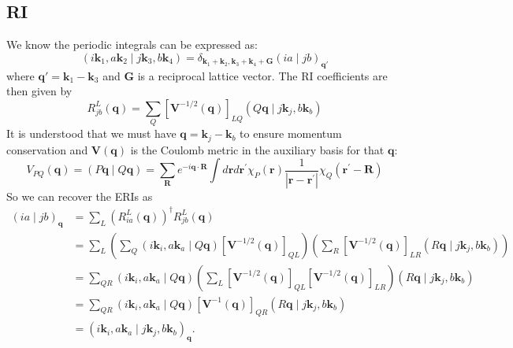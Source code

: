 \subsection{RI}
We know the periodic integrals can be expressed as:
\begin{equation}
    \left(i \mathbf{k}_1, a \mathbf{k}_2 \mid j \mathbf{k}_3, b \mathbf{k}_4\right)=\delta_{\mathbf{k}_1+\mathbf{k}_2, \mathbf{k}_3+\mathbf{k}_4+\mathbf{G}}(i a \mid j b)_{\mathbf{q}'}
\end{equation}
where $\mathbf{q}'=\mathbf{k}_1-\mathbf{k}_3$ and $\mathbf{G}$ is a reciprocal lattice vector. The RI coefficients are then given by
\begin{equation}
    R_{jb}^L(\mathbf{q})=\sum_Q\left[\mathbf{V}^{-1 / 2}(\mathbf{q})\right]_{LQ} \left( Q \mathbf{q} \mid j \mathbf{k}_j, b \mathbf{k}_b\right)
\end{equation}
It is understood that we must have $\bm{q} = \mathbf{k}_j - \mathbf{k}_b$ to ensure momentum conservation and $\mathbf{V}(\mathbf{q})$ is the Coulomb metric in the auxiliary basis for that $\mathbf{q}$:
\begin{equation}
    V_{P Q}(\mathbf{q})=(P \mathbf{q} \mid Q \mathbf{q})=\sum_{\mathbf{R}} e^{-i \mathbf{q} \cdot \mathbf{R}} \int d \mathbf{r} d \mathbf{r}^{\prime} \chi_P(\mathbf{r}) \frac{1}{\left|\mathbf{r}-\mathbf{r}^{\prime}\right|} \chi_Q\left(\mathbf{r}^{\prime}-\mathbf{R}\right)
\label{coul}
\end{equation}
So we can recover the ERIs as
\begin{align}
    (i a \mid j b)_{\mathbf{q}} &= \sum_L \left( R_{i a}^L(\mathbf{q}) \right) ^\dagger R_{j b}^L(\mathbf{q}) \\
    &= \sum_L \left( \sum_Q (i \mathbf{k}_i, a \mathbf{k}_a \mid Q \mathbf{q}) [\mathbf{V}^{-1/2}(\mathbf{q})]_{Q L} \right)
       \left( \sum_R [\mathbf{V}^{-1/2}(\mathbf{q})]_{LR}(R \mathbf{q} \mid j \mathbf{k}_j, b \mathbf{k}_b)\right) \\
    &= \sum_{Q R} (i \mathbf{k}_i, a \mathbf{k}_a \mid Q \mathbf{q}) \left( \sum_L [\mathbf{V}^{-1/2}(\mathbf{q})]_{Q L} [\mathbf{V}^{-1/2}(\mathbf{q})]_{LR} \right)
       (R \mathbf{q} \mid j \mathbf{k}_j, b \mathbf{k}_b)\\
    &= \sum_{Q R} (i \mathbf{k}_i, a \mathbf{k}_a \mid Q \mathbf{q}) [\mathbf{V}^{-1}(\mathbf{q})]_{Q R}
       (R \mathbf{q} \mid j \mathbf{k}_j, b \mathbf{k}_b) \\
    &= (i \mathbf{k}_i, a \mathbf{k}_a \mid j \mathbf{k}_j, b \mathbf{k}_b)_{\mathbf{q}}.
\end{align}
